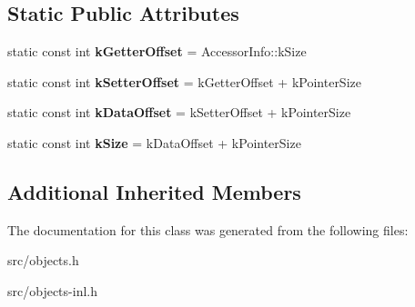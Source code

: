 \subsection*{Static Public Attributes}
\begin{DoxyCompactItemize}
\item 
\hypertarget{classv8_1_1internal_1_1_executable_accessor_info_a9b9a4505ec267627dee62b95867e772e}{}static const int {\bfseries k\+Getter\+Offset} = Accessor\+Info\+::k\+Size\label{classv8_1_1internal_1_1_executable_accessor_info_a9b9a4505ec267627dee62b95867e772e}

\item 
\hypertarget{classv8_1_1internal_1_1_executable_accessor_info_a32d5a88aee1215ef9cad9a6d6dc5acdd}{}static const int {\bfseries k\+Setter\+Offset} = k\+Getter\+Offset + k\+Pointer\+Size\label{classv8_1_1internal_1_1_executable_accessor_info_a32d5a88aee1215ef9cad9a6d6dc5acdd}

\item 
\hypertarget{classv8_1_1internal_1_1_executable_accessor_info_a3cbe873b93a5d46b08a95300380c3865}{}static const int {\bfseries k\+Data\+Offset} = k\+Setter\+Offset + k\+Pointer\+Size\label{classv8_1_1internal_1_1_executable_accessor_info_a3cbe873b93a5d46b08a95300380c3865}

\item 
\hypertarget{classv8_1_1internal_1_1_executable_accessor_info_ae66647060d46f894a8e858e6b0ff8212}{}static const int {\bfseries k\+Size} = k\+Data\+Offset + k\+Pointer\+Size\label{classv8_1_1internal_1_1_executable_accessor_info_ae66647060d46f894a8e858e6b0ff8212}

\end{DoxyCompactItemize}
\subsection*{Additional Inherited Members}


The documentation for this class was generated from the following files\+:\begin{DoxyCompactItemize}
\item 
src/objects.\+h\item 
src/objects-\/inl.\+h\end{DoxyCompactItemize}
